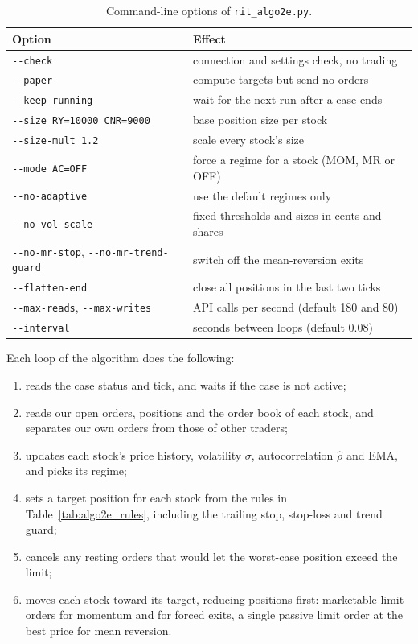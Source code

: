 \documentclass{article}
\begin{document}
\begin{table}[H]
\centering
\begin{tabular}{ll}
\toprule
Option & Effect \\
\midrule
\texttt{-{}-check} & connection and settings check, no trading \\
\texttt{-{}-paper} & compute targets but send no orders \\
\texttt{-{}-keep-running} & wait for the next run after a case ends \\
\texttt{-{}-size RY=10000 CNR=9000} & base position size per stock \\
\texttt{-{}-size-mult 1.2} & scale every stock's size \\
\texttt{-{}-mode AC=OFF} & force a regime for a stock (MOM, MR or OFF) \\
\texttt{-{}-no-adaptive} & use the default regimes only \\
\texttt{-{}-no-vol-scale} & fixed thresholds and sizes in cents and shares \\
\texttt{-{}-no-mr-stop}, \texttt{-{}-no-mr-trend-guard} & switch off the mean-reversion exits \\
\texttt{-{}-flatten-end} & close all positions in the last two ticks \\
\texttt{-{}-max-reads}, \texttt{-{}-max-writes} & API calls per second (default 180 and 80) \\
\texttt{-{}-interval} & seconds between loops (default 0.08) \\
\bottomrule
\end{tabular}
\caption{Command-line options of \texttt{rit\_algo2e.py}.}
\label{tab:algo2e_options}
\end{table}

\noindent Each loop of the algorithm does the following:
\begin{enumerate}
  \item reads the case status and tick, and waits if the case is not active;
  \item reads our open orders, positions and the order book of each stock, and separates our own orders from those of other traders;
  \item updates each stock's price history, volatility $\sigma$, autocorrelation $\hat\rho$ and EMA, and picks its regime;
  \item sets a target position for each stock from the rules in Table~\ref{tab:algo2e_rules}, including the trailing stop, stop-loss and trend guard;
  \item cancels any resting orders that would let the worst-case position exceed the limit;
  \item moves each stock toward its target, reducing positions first: marketable limit orders for momentum and for forced exits, a single passive limit order at the best price for mean reversion.
\end{enumerate}
\end{document}
